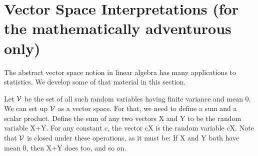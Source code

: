 % 
% 
% 
% 
% 

% 
% 


\section{Vector Space Interpretations (for the mathematically
adventurous only)}
\label{adventure}

The abstract vector space notion in linear algebra has many applications
to statistics.  We develop some of that material in this section.


Let $\cal V$ be the set of all such random variables having finite
variance and mean 0.  We can set up $\cal V$ as a vector space.  For that,
we need to define a sum and a scalar product.  Define the sum of any two
vectors X and Y to be the random variable X+Y.  For any constant c, the
vector cX is the random variable cX.  Note that $\cal V$ is closed under
these operations, as it must be:  If X and Y both have mean 0, then X+Y
does too, and so on.

